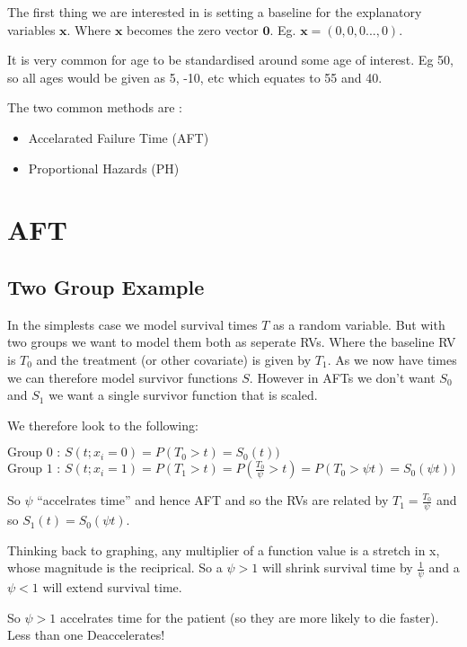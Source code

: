 \documentclass[
  letterpaper,
  DIV=11,
  numbers=noendperiod]{scrreprt}
\providecommand{\tightlist}{%
  \setlength{\itemsep}{0pt}\setlength{\parskip}{0pt}}\usepackage{longtable,booktabs,array}
\begin{document}
The first thing we are interested in is setting a baseline for the
explanatory variables \(\textbf{x}\). Where \(\textbf{x}\) becomes the
zero vector \(\textbf{0}\). Eg. \(\textbf{x} = (0,0,0...,0)\).

It is very common for age to be standardised around some age of
interest. Eg 50, so all ages would be given as 5, -10, etc which equates
to 55 and 40.

The two common methods are :

\begin{itemize}
\tightlist
\item
  Accelarated Failure Time (AFT)
\item
  Proportional Hazards (PH)
\end{itemize}

\hypertarget{aft}{%
\section{AFT}\label{aft}}

\hypertarget{two-group-example}{%
\subsection{Two Group Example}\label{two-group-example}}

In the simplests case we model survival times \(T\) as a random
variable. But with two groups we want to model them both as seperate
RVs. Where the baseline RV is \(T_0\) and the treatment (or other
covariate) is given by \(T_1\). As we now have times we can therefore
model survivor functions \(S\). However in AFTs we don't want \(S_0\)
and \(S_1\) we want a single survivor function that is scaled.

We therefore look to the following:

\(\text{Group 0 :   } S(t ; x_i=0) = P(T_0>t) = S_0(t))\)
\(\text{Group 1 :   } S(t ; x_i=1) = P(T_1>t) = P(\frac{T_0}{\psi}> t) = P(T_0>\psi t) = S_0(\psi t))\)

So \(\psi\) ``accelrates time'' and hence AFT and so the RVs are related
by \(T_1 = \frac{T_0}{\psi}\) and so \(S_1(t) = S_0(\psi t)\).

Thinking back to graphing, any multiplier of a function value is a
stretch in x, whose magnitude is the reciprical. So a \(\psi >1\) will
shrink survival time by \(\frac{1}{\psi}\) and a \(\psi <1\) will extend
survival time.

So \(\psi >1\) accelrates time for the patient (so they are more likely
to die faster). Less than one Deaccelerates!
\end{document}
